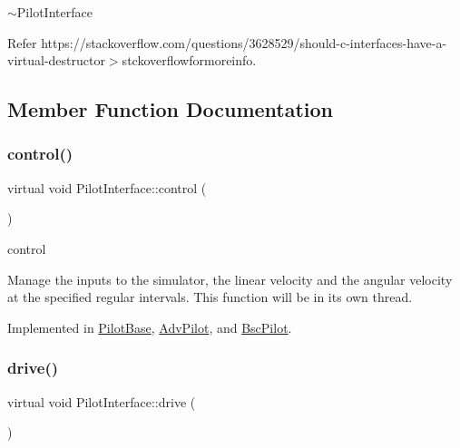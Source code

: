 $\sim$\+Pilot\+Interface 


\begin{DoxyItemize}
\item 
\end{DoxyItemize}

Refer https\+://stackoverflow.\+com/questions/3628529/should-\/c-\/interfaces-\/have-\/a-\/virtual-\/destructor$>$stckoverflowformoreinfo.

\subsection{Member Function Documentation}
\mbox{\label{classPilotInterface_a8847bf56785f024f6168e7c57bbb78dc}} 
\subsubsection{\texorpdfstring{control()}{control()}}
{\footnotesize\ttfamily virtual void Pilot\+Interface\+::control (\begin{DoxyParamCaption}{ }\end{DoxyParamCaption})\hspace{0.3cm}{\ttfamily [pure virtual]}}



control 

Manage the inputs to the simulator, the linear velocity and the angular velocity at the specified regular intervals. This function will be in its own thread. 

Implemented in \hyperlink{classPilotBase_a611edd0c1a501e1bb6722f5b62e95d6b}{Pilot\+Base}, \hyperlink{classAdvPilot_a5da70d6e9d93bf585a84af786d067739}{Adv\+Pilot}, and \hyperlink{classBscPilot_a42240aa898a2719f14d816bbe08a0f3f}{Bsc\+Pilot}.

\mbox{\label{classPilotInterface_a73569195611ac3b77b85b8c3a317b1cf}} 
\subsubsection{\texorpdfstring{drive()}{drive()}}
{\footnotesize\ttfamily virtual void Pilot\+Interface\+::drive (\begin{DoxyParamCaption}{ }\end{DoxyParamCaption})\hspace{0.3cm}{\ttfamily [pure virtual]}}



